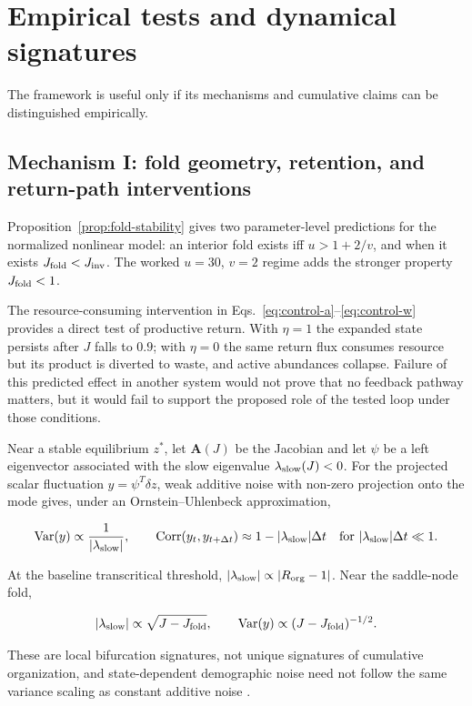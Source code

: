 \documentclass[11pt,a4paper]{article}
\begin{document}
\section{Empirical tests and dynamical signatures}

The framework is useful only if its mechanisms and cumulative claims can be distinguished empirically.

\subsection{Mechanism I: fold geometry, retention, and return-path interventions}

Proposition~\ref{prop:fold-stability} gives two parameter-level predictions for the normalized nonlinear model: an interior fold exists iff $u>1+2/v$, and when it exists $J_{\rm fold}<J_{\rm inv}$. The worked $u=30$, $v=2$ regime adds the stronger property $J_{\rm fold}<1$.

The resource-consuming intervention in Eqs.~\eqref{eq:control-a}--\eqref{eq:control-w} provides a direct test of productive return. With $\eta=1$ the expanded state persists after $J$ falls to $0.9$; with $\eta=0$ the same return flux consumes resource but its product is diverted to waste, and active abundances collapse. Failure of this predicted effect in another system would not prove that no feedback pathway matters, but it would fail to support the proposed role of the tested loop under those conditions.

Near a stable equilibrium $z^*$, let $\mathbf A(J)$ be the Jacobian and let $\psi$ be a left eigenvector associated with the slow eigenvalue $\lambda_{\rm slow}(J)<0$. For the projected scalar fluctuation $y=\psi^T\delta z$, weak additive noise with non-zero projection onto the mode gives, under an Ornstein--Uhlenbeck approximation,

\[
\operatorname{Var}(y)\propto\frac{1}{|\lambda_{\rm slow}|},
\qquad
\operatorname{Corr}(y_t,y_{t+\Delta t})\approx1-|\lambda_{\rm slow}|\Delta t
\quad\text{for }|\lambda_{\rm slow}|\Delta t\ll1.
\]

At the baseline transcritical threshold, $|\lambda_{\rm slow}|\propto|R_{\rm org}-1|$. Near the saddle-node fold,

\[
|\lambda_{\rm slow}|\propto\sqrt{J-J_{\rm fold}},
\qquad
\operatorname{Var}(y)\propto(J-J_{\rm fold})^{-1/2}.
\]

These are local bifurcation signatures, not unique signatures of cumulative organization, and state-dependent demographic noise need not follow the same variance scaling as constant additive noise \citep{Scheffer2009,Dakos2012}.
\end{document}
